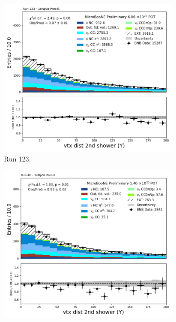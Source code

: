 \begin{figure}[H]
    \centering
    \begin{subfigure}[t]{0.32\linewidth}
        \includegraphics[width=\linewidth]{technote/Appendix_Preselection/Figures/1eNp0pi/Run123/secondshower_Y_vtxdist_Run123_1eNp0pi_Presel.png}
        \caption{Run 123.}
    \end{subfigure}%
    \hspace{0.2cm}%
    \begin{subfigure}[t]{0.32\linewidth}
        \includegraphics[width=\linewidth]{technote/Appendix_Preselection/Figures/1eNp0pi/Run4b/secondshower_Y_vtxdist_Run4b_1eNp0pi_Presel.png}

\end{subfigure}
\end{figure}
